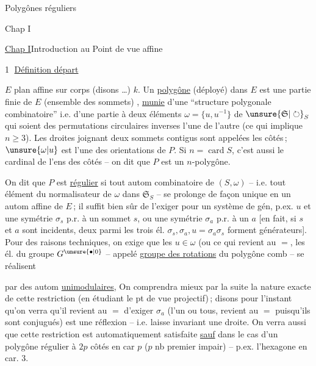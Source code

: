 Polygônes réguliers

Chap I

\uline{Chap I}\qquad Introduction au Point de vue affine


\textcircled{1} \uline{Définition  départ}

$E$ plan affine sur corps (disons \ldots) $k$. Un \uline{polygône}
(déployé) dans $E$ est une partie finie  de $E$
(ensemble des sommets) , \uline{munie} d'une
``structure polygonale combinatoire'' i.e. d'une
partie à deux éléments $\omega=\{u,u^{-1}\}$ de $\unsure{\mathfrak{S}|\circlearrowright}_S$ qui soient
des permutations circulaires inverses l'une de l'autre (ce qui implique $n\geq3$). Les droites
joignant deux sommets contigus sont appelées les côtés\,; $\unsure{\omega|u}$ est  l'une des orientations de $P$. Si $n=\operatorname{card}S$,
c'est aussi le cardinal de l'ens des côtés -- on dit que $P$ est un $n$-polygône.

On dit que $P$ est \uline{régulier} si tout
autom combinatoire de  $(S,\omega)$ -- i.e. tout
élément du normalisateur  de $\omega$ dans $\mathfrak{S}_S$ --
se prolonge de façon unique en un autom
affine de $E$\,; il suffit bien sûr de l'exiger pour
 un système de gén, p.ex.  $u$ et une symétrie
$\sigma_s$ p.r. à un sommet $s$, ou une symétrie $\sigma_a$
p.r. à un   $a$ [en fait, si $s$ et $a$ sont
incidents, deux  parmi les trois él. $\sigma_s,\sigma_a,u=\sigma_a\sigma_s$
forment   générateurs]. Pour des raisons
techniques, on exige que les $u\in\omega$
(ou ce qui revient au $=$, les él. du
groupe  $G^{\unsure{\bullet|0}}$  -- appelé \uline{groupe des
rotations} du polygône comb -- se réalisent

par des autom \uline{unimodulaires},  On
comprendra mieux par la suite la nature
exacte de cette restriction (en étudiant
le pt de vue projectif)\,; disons pour
l'instant qu'on verra qu'il revient au
$=$ d'exiger $\sigma_a$ (l'un ou tous, 
revient au $=$ puisqu'ils sont conjugués)
est une réflexion -- i.e. laisse invariant
une droite. On verra aussi que cette
restriction est automatiquement satisfaite
\uline{sauf} dans le cas d'un polygône régulier
à $2p$ côtés en car $p$ ($p$ nb premier
impair) -- p.ex. l'hexagone en car. 3.

